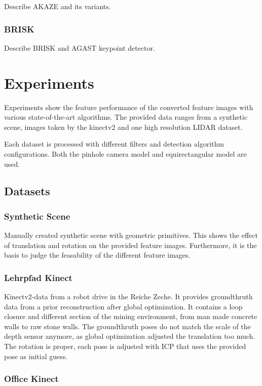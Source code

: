 Describe AKAZE and its variants.

\subsubsection{BRISK}

Describe BRISK and AGAST keypoint detector.

\section{Experiments}

Experiments show the feature performance of the converted feature images with various state-of-the-art algorithms.
The provided data ranges from a synthetic scene, images taken by the kinectv2 and one high resolution LIDAR dataset.

Each dataset is processed with different filters and detection algorithm configurations.
Both the pinhole camera model and equirectangular model are used.

\subsection{Datasets}
\subsubsection{Synthetic Scene}

Manually created synthetic scene with geometric primitives.
This shows the effect of translation and rotation on the provided feature images.
Furthermore, it is the basis to judge the feasability of the different feature images.

\subsubsection{Lehrpfad Kinect}

Kinectv2-data from a robot drive in the Reiche Zeche.
It provides groundthruth data from a prior reconstruction after global optimization.
It contains a loop closure and different section of the mining environment, from man made concrete walls to raw stone walls.
The groundthruth poses do not match the scale of the depth sensor anymore, as global optimization adjusted the translation too much.
The rotation is proper, each pose is adjusted with ICP that uses the provided pose as initial guess.

\subsubsection{Office Kinect}



